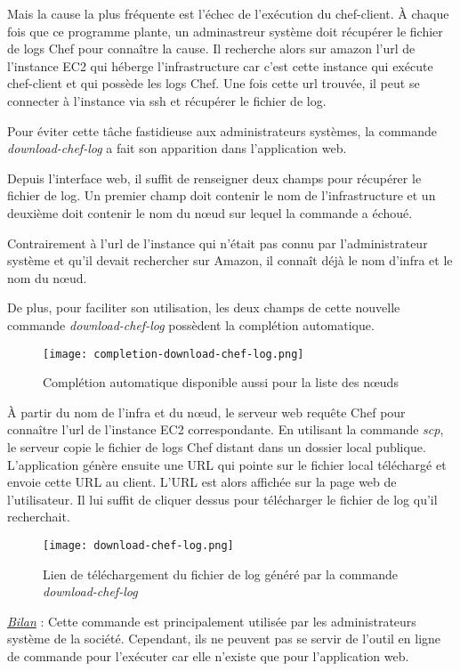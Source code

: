 Mais la cause la plus fréquente est l'échec de l'exécution du chef-client.
À chaque fois que ce programme plante, un adminastreur système doit récupérer le
fichier de logs Chef pour connaître la cause. Il recherche alors sur amazon
l'url de l'instance EC2 qui héberge l'infrastructure car c'est cette instance
qui exécute chef-client et qui possède les logs Chef. Une fois cette url
trouvée, il peut se connecter à l'instance via ssh et récupérer le fichier de
log.

Pour éviter cette tâche fastidieuse aux administrateurs systèmes, la commande
\textit{download-chef-log} a fait son apparition dans l'application web.

Depuis l'interface web, il suffit de renseigner deux champs pour récupérer le
fichier de log. Un premier champ doit contenir le nom de l'infrastructure et un
deuxième doit contenir le nom du nœud sur lequel la commande a échoué.

Contrairement à l'url de l'instance qui n'était pas connu par l'administrateur
système et qu'il devait rechercher sur Amazon, il connaît déjà le nom d'infra et
le nom du nœud.

De plus, pour faciliter son utilisation, les deux champs de cette nouvelle
commande \textit{download-chef-log} possèdent la complétion automatique.

\begin{figure}[H]
  \texttt{[image: completion-download-chef-log.png]}
  \caption{Complétion automatique disponible aussi pour la liste des nœuds}
\end{figure}

À partir du nom de l'infra et du nœud, le serveur web requête Chef pour
connaître l'url de l'instance EC2 correspondante. En utilisant la commande
\textit{scp}, le serveur copie le fichier de logs Chef distant dans un
dossier local publique.
L'application génère ensuite une URL qui pointe sur le fichier local téléchargé
et envoie cette URL au client.
L'URL est alors affichée sur la page web de l'utilisateur. Il lui suffit de
cliquer dessus pour télécharger le fichier de log qu'il recherchait.


\begin{figure}[H]
  \texttt{[image: download-chef-log.png]}
  \caption{Lien de téléchargement du fichier de log généré par la commande \textit{download-chef-log}}
\end{figure}

\underline{\textit{Bilan}} : Cette commande est principalement utilisée par les
administrateurs système de la société. Cependant, ils ne peuvent pas se servir
de l'outil en ligne de commande pour l'exécuter car elle n'existe que pour
l'application web.

